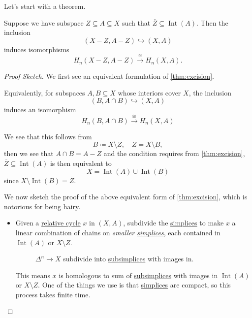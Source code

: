 Let's start with a theorem.
\begin{theorem}[Excision]\label{thm:excision}
	Suppose we have subspace \(Z \subseteq A \subseteq X\) such that \(\overline{Z} \subseteq \operatorname{Int} (A)\). Then the inclusion
	\[
		(X - Z, A - Z) \hookrightarrow (X, A)
	\]
	induces isomorphisms
	\[
		H_n(X - Z, A - Z) \xrightarrow{\cong} H_n(X, A).
	\]
\end{theorem}
\begin{proof}[Proof Sketch]
	We first see an equivalent formulation of \autoref{thm:excision}.
	\begin{remark}
		Equivalently, for subspaces \(A, B \subseteq X\) whose interiors cover \(X\), the inclusion
		\[
			(B, A \cap B) \hookrightarrow (X, A)
		\]
		induces an isomorphism
		\[
			H_n(B, A \cap B) \xrightarrow{\cong} H_n(X, A)
		\]
	\end{remark}
	\begin{explanation}
		We see that this follows from
		\[
			B \coloneqq X \setminus Z,\quad Z = X \setminus B,
		\]
		then we see that \(A \cap B = A - Z\) and the condition requires from \autoref{thm:excision},
		\(\overline{Z} \subseteq \operatorname{Int}(A)\) is then equivalent to
		\[
			X = \operatorname{Int}(A) \cup \operatorname{Int}(B)
		\]
		since \(X \setminus \operatorname{Int}(B) = \overline{Z} \).
		\begin{figure}[H]
			\centering
			\label{fig:eg:excision-1}
		\end{figure}
	\end{explanation}

	We now sketch the proof of the above equivalent form of \autoref{thm:excision}, which is notorious for being hairy.
	\begin{itemize}
		\item Given a \hyperref[def:relative-cycle]{relative cycle} \(x\) in \((X, A)\), subdivide the \hyperref[def:standard-simplex]{simplices} to make \(x\) a
		      linear combination of chains on \emph{smaller \hyperref[def:standard-simplex]{simplices}}, each contained in \(\operatorname{Int}(A)\) or \(X \setminus Z\).
		      \begin{figure}[H]
			      \centering
			      \caption{\(\Delta ^n\to X\) subdivide into \hyperref[def:subsimplex]{subsimplices} with images in. }
			      \label{fig:pf:excision}
		      \end{figure}
		      This means \(x\) is homologous to sum of \hyperref[def:subsimplex]{subsimplices} with images in \(\operatorname{Int}(A)\) or \(X \setminus Z\). One of the things we
		      use is that \hyperref[def:standard-simplex]{simplices} are compact, so this process takes finite time.


\end{itemize}
\end{proof}
